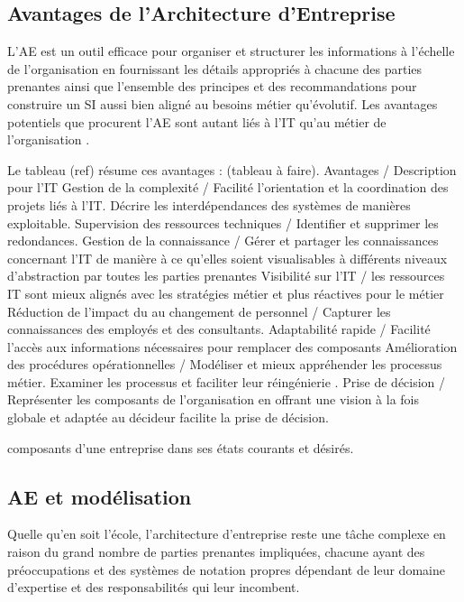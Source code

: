 \subsection{Avantages de l'Architecture d'Entreprise}
L'AE est un outil efficace pour organiser et structurer les informations à 
l'échelle de l'organisation en fournissant les détails appropriés à chacune des 
parties prenantes ainsi que l'ensemble des principes et des recommandations pour 
construire un SI aussi bien aligné au besoins métier qu'évolutif. Les avantages 
potentiels que procurent l'AE sont autant liés à l'IT qu'au métier de 
l'organisation \cite{ross2005understanding}.

Le tableau (ref) résume ces avantages \cite{shah2007frameworks} : 
(tableau à faire). 
Avantages / Description
pour l'IT
Gestion de la complexité / Facilité l'orientation et la coordination des projets 
liés à l'IT. Décrire les interdépendances des systèmes de manières exploitable.
Supervision des ressources techniques / Identifier et supprimer les redondances.
Gestion de la connaissance /  Gérer et partager les connaissances concernant 
l'IT de manière à ce qu'elles soient visualisables à différents niveaux 
d'abstraction par toutes les parties prenantes 
Visibilité sur l'IT / les ressources IT sont mieux alignés avec les stratégies 
métier et plus réactives
pour le métier 
Réduction de l'impact du au changement de personnel / Capturer les connaissances 
des employés et des consultants. 
Adaptabilité rapide /  Facilité l'accès aux informations nécessaires pour 
remplacer des composants
Amélioration des procédures opérationnelles / Modéliser et mieux appréhender les 
processus métier. Examiner les processus et faciliter leur réingénierie  .
Prise de décision / Représenter les composants de l'organisation  en offrant une 
vision à la fois globale et adaptée au décideur facilite la prise de décision.




composants d'une entreprise dans ses états courants et désirés.  

\subsection{AE et modélisation}

Quelle qu'en soit l'école, l'architecture d'entreprise reste une tâche complexe 
\cite{steen2004supporting} en raison du grand nombre de parties prenantes 
impliquées, chacune ayant des préoccupations et des systèmes de notation propres 
dépendant de leur domaine d'expertise et des responsabilités qui leur incombent.

